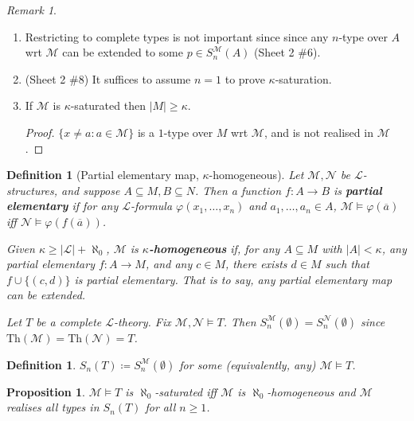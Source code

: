 \documentclass[]{article}
\theoremstyle{custhm}
\theoremstyle{cusdef}
\newtheorem{defin}[theorem]{Definition}
\theoremstyle{custhm}
\theoremstyle{custhm}
\theoremstyle{custhm}
\newtheorem{prop}[theorem]{Proposition}
\theoremstyle{ex}
\theoremstyle{custhm}
\theoremstyle{cusdef}
\theoremstyle{remark}
\theoremstyle{remark}
\newtheorem{remark}[theorem]{Remark}
\newcommand{\ra}{\rightarrow}
\newcommand{\undf}[1]{\textit{\textbf{#1}}}
\renewcommand{\L}{\mathcal{L}}
\newcommand{\M}{\mathcal{M}}
\renewcommand{\phi}{\varphi}
\renewcommand{\bar}{\overline}
\newcommand{\Th}{\textrm{Th}}
\newcommand{\N}{\mathcal{N}}
\renewcommand{\subset}{\subseteq}
\begin{document}
\begin{remark}\ 
\begin{enumerate}[label = \alph*)]
	\item Restricting to complete types is not important since since any $n$-type over $A$ wrt $\M$ can be extended to some $p \in S_n^\M(A)$ (Sheet 2 \#6).
	\item (Sheet 2 \#8) It suffices to assume $n = 1$ to prove $\kappa$-saturation.
	\item If $\M$ is $\kappa$-saturated then $|M| \ge \kappa$.
	\begin{proof}
		$\{x \ne a:a\in \M\}$ is a $1$-type over $M$ wrt $\M$, and is not realised in $\M$.
	\end{proof}
\end{enumerate}
\end{remark}
\begin{defin}[Partial elementary map, $\kappa$-homogeneous]
Let $\M,\N$ be $\L$-structures, and suppose $A\subset M,B\subset N$. Then a function $f:A\ra B$ is \undf{partial elementary} if for any $\L$-formula $\phi(x_1,\dots,x_n)$ and $a_1,\dots,a_n\in A$, $\M\models \phi(\bar{a})$ iff $\N\models \phi(f(\bar{a}))$.

Given $\kappa\ge |\L| + \aleph_0$, $\M$ is \undf{$\kappa$-homogeneous} if, for any $A\subset M$ with $|A| < \kappa$, any partial elementary $f:A\ra M$, and any $c\in M$, there exists $d \in M$ such that $f\cup \{(c,d)\}$ is partial elementary. That is to say, any partial elementary map can be extended.

Let $T$ be a complete $\L$-theory. Fix $\M,\N\models T$. Then $S_n^\M(\emptyset) = S_n^\N(\emptyset)$ since $\Th(\M) = \Th(\N) = T$.
\end{defin}
\begin{defin}
$S_n(T) \coloneqq S_n^\M(\emptyset)$ for some (equivalently, any) $\M\models T$.
\end{defin}
\begin{prop}
$\M\models T$ is $\aleph_0$-saturated iff $\M$ is $\aleph_0$-homogeneous and $\M$ realises all types in $S_n(T)$ for all $n\ge 1$.
\end{prop}
\end{document}
